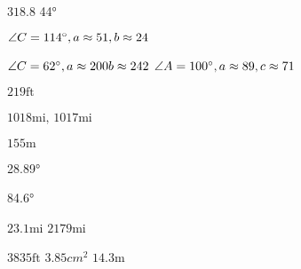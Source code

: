 \begin{Answer}[ref={exApplications}]

	\Question %
\begin{tasks}
	\task 	$318.8$ 
	\task 	\ang{44}
\end{tasks}
\Question %
$\angle C =114 \mbox{{\ensuremath{{}^\circ}}} ,a \approx 51 ,b \approx 24$
\Question %
\begin{tasks}
	\task 	$\angle C =62 \mbox{{\ensuremath{{}^\circ}}} ,a \approx 200 b \approx 242$
	\task 	$\angle A =100 \mbox{{\ensuremath{{}^\circ}}} ,a \approx 89 ,c \approx 71$
\end{tasks}
	\Question%
	$219 \mbox{ft}$

\Question %
\begin{tasks}
	\task $1018 \mbox{mi}\text{,}$
	\task $1017 \mbox{mi}$
\end{tasks}

	\Question %
	$155 \mbox{m}$
	
\Question %
\begin{tasks}
	\task 	\ang{28.89}
\end{tasks}
\Question %
\begin{tasks}
	\task 	\ang{84.6}
\end{tasks}
\Question %
$23.1 \mbox{mi}$
\Question %
$2179 \mbox{mi}$

	\Question %
	$3835 \mbox{ft}$ 
	\Question %
	$3.85 cm^{2}$
	\Question %
	$14.3 \mbox{m}$
	
\end{Answer}%


